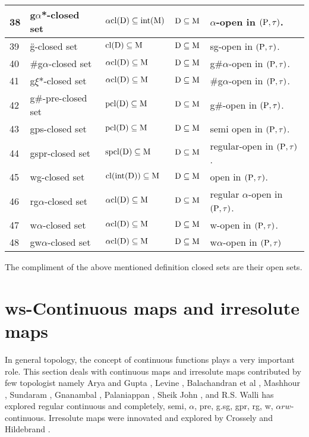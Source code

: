{\begin{longtable}{@{}|p{.9cm}|>{\raggedright}p{5cm}|>{\centering}p{2.5cm}|>{\centering}p{1.7cm}|>{\centering}p{2.8cm}|@{}}
38 & g$\alpha$*-closed set \cite{Maki3} & $\alpha\mathrm{cl}(\mathrm{D}) \subseteq\mbox{int}(\mathrm{M})$ & $\mathrm{D} \subseteq \mathrm{M}$ & $\alpha$-open in $(\mathrm{P}, \tau)$.\tabularnewline
\hline
39 & \"g-closed set \cite{key} & $\mathrm{cl}(\mathrm{D}) \subseteq \mathrm{M}$ & $\mathrm{D} \subseteq \mathrm{M}$ & sg-open in $(\mathrm{P}, \tau)$.\tabularnewline
\hline
40 & \#g$\alpha$-closed set \cite{Maki4} & $\alpha\mathrm{cl}(\mathrm{D}) \subseteq \mathrm{M}$ & $\mathrm{D} \subseteq \mathrm{M}$ & g\#$\alpha$-open in $(\mathrm{P}, \tau)$.\tabularnewline
\hline
41 & g$\xi$*-closed set \cite{VivekPrabu} & $\alpha\mathrm{cl}(\mathrm{D}) \subseteq \mathrm{M}$ & $\mathrm{D} \subseteq \mathrm{M}$ & \#g$\alpha$-open in $(\mathrm{P}, \tau)$.\tabularnewline
\hline
42 & g\#-pre-closed set \cite{Pious} & $\mathrm{pcl}(\mathrm{D}) \subseteq \mathrm{M}$ & $\mathrm{D} \subseteq \mathrm{M}$ & g\#-open in $(\mathrm{P}, \tau)$.\tabularnewline
\hline
43 & gps-closed set \cite{Gnanambal1} & $\mathrm{pcl}(\mathrm{D}) \subseteq \mathrm{M}$ & $\mathrm{D} \subseteq \mathrm{M}$ & semi open in $(\mathrm{P}, \tau)$.\tabularnewline
\hline
44 & gspr-closed set \cite{Navalagi} & $\mathrm{spcl}(\mathrm{D}) \subseteq \mathrm{M}$ & $\mathrm{D} \subseteq \mathrm{M}$ & regular-open in $(\mathrm{P}, \tau)$.\tabularnewline
\hline
45 & wg-closed set \cite{Nagaveni3} & $\mathrm{cl}(\mbox{int}(\mathrm{D})) \subseteq \mathrm{M}$ & $\mathrm{D} \subseteq \mathrm{M}$ & open in $(\mathrm{P}, \tau)$.\tabularnewline
\hline
46 & rg$\alpha$-closed set \cite{Vadivel} & $\alpha\mathrm{cl}(\mathrm{D}) \subseteq \mathrm{M}$ & $\mathrm{D} \subseteq \mathrm{M}$ & regular $\alpha$-open in $(\mathrm{P}, \tau)$.\tabularnewline
\hline
47 & w$\alpha$-closed set \cite{Benchalli1} & $\alpha\mathrm{cl}(\mathrm{D}) \subseteq \mathrm{M}$ & $\mathrm{D} \subseteq \mathrm{M}$ & w-open in $(\mathrm{P}, \tau)$.\tabularnewline
\hline
48 & gw$\alpha$-closed set \cite{Benchalli2} & $\alpha\mathrm{cl}(\mathrm{D}) \subseteq \mathrm{M}$ & $\mathrm{D} \subseteq \mathrm{M}$ & w$\alpha$-open in $(\mathrm{P}, \tau)$\tabularnewline
\hline
\end{longtable}}

The compliment of the above mentioned definition closed sets are their open sets. 

\section{ws-Continuous maps and irresolute maps}

In general topology, the concept of continuous functions plays a very important role. This section deals with continuous maps and irresolute maps contributed by few topologist namely Arya and Gupta \cite{Arya1},  Levine \cite{Levine1}, Balachandran et al \cite{Maki11}, Mashhour \cite{Abd1}, Sundaram \cite{Maki2},  Gnanambal \cite{Gnanambal}, Palaniappan \cite{Palaniappan}, Sheik John \cite{Sheik1}, and R.S. Walli \cite{Wali4} has explored regular continuous and completely, semi,  $\alpha$, pre, g.sg, gpr, rg, w, $\alpha rw$-continuous. Irresolute maps were innovated and explored by Crossely and Hildebrand \cite{Crossley}.

